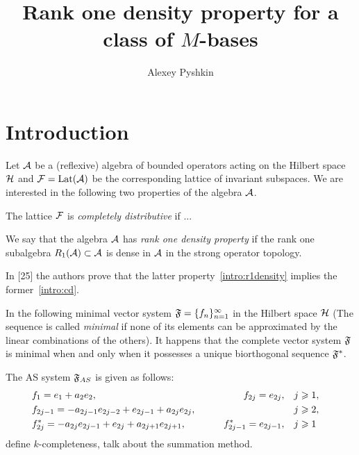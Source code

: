 \documentclass[12pt]{amsart}
\begin{document}
 \title{Rank one density property for a class of $M$-bases}
 \author{Alexey Pyshkin}
 \maketitle{}

\section{Introduction}
  Let $\cal{A}$ be a (reflexive) algebra of bounded operators acting on the Hilbert space $\cal{H}$
    and $\cal{F} = \operatorname{Lat}(\cal{A})$ be the corresponding lattice of invariant subspaces.
  We are interested in the following two properties of the algebra $\cal{A}$.
  \begin{definition}
    \label{intro:cd}
    The lattice $\cal{F}$ is \emph{completely distributive} if ...
  \end{definition}
  \begin{definition}
    \label{intro:r1density}
    We say that the algebra $\cal{A}$ has \emph{rank one density property} if
      the rank one subalgebra $R_1(\cal{A}) \subset \cal{A}$ is dense in $\cal{A}$ in the strong operator topology.
  \end{definition}

  In [25] the authors prove that the latter property~\ref{intro:r1density} implies the former~\ref{intro:cd}.

  In the following  minimal vector system $\fsys = \seq{f}$ in the Hilbert space $\cal{H}$
  (The sequence is called \emph{minimal} if none of its elements can be approximated by the linear
    combinations of the others).
  It happens that the complete vector system $\fsys$ is minimal when and only when it possesses a unique
    biorthogonal sequence $\fstarsys$.
  
    The AS system $\fsys_{AS}$ is given as follows:
    \begin{equation}
      \label{as-sys}
      \begin{aligned}
        &f_1 = e_1 + a_2 e_2, \qquad &f_{2j}=e_{2j}, \quad&j \geq 1,&\\
        &f_{2j-1}=-a_{2j-1}e_{2j-2} + e_{2j-1} + a_{2j}e_{2j}, \qquad &\makebox[5em]{} \quad&j \geq 2,&\\
        &f^*_{2j}=-a_{2j}e_{2j-1}+e_{2j}+a_{2j+1}e_{2j+1}, \qquad &f^*_{2j-1}=e_{2j-1}, \quad&j \geq 1&
      \end{aligned}
    \end{equation}
    define $k$-completeness, talk about the summation method.
\end{document}
